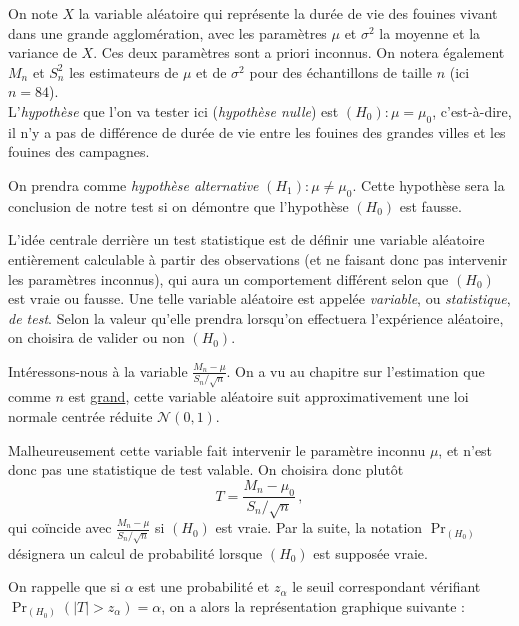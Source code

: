 \documentclass[12pt, a4paper]{book}
\numberwithin{equation}{section}
\begin{document}
 
On note $X$ la variable aléatoire qui représente la durée de vie des fouines vivant dans une grande 
agglomération, avec les paramètres $\mu$ et $\sigma^2$ la moyenne et la variance de $X$. 
Ces deux paramètres sont a priori inconnus. 
On notera également $M_n$ et $S^2_n$ les estimateurs de $\mu$ et de $\sigma^2$ pour des
échantillons de taille $n$ (ici $n=84$).\\

L'{\it hypothèse} que l'on va tester ici ({\it hypothèse nulle}) est $(H_0) : \mu=\mu_0$, c'est-à-dire, il n'y
a pas de différence de durée de vie entre les fouines des grandes villes et les fouines des campagnes.

On prendra comme {\it hypothèse alternative} $(H_1) : \mu \neq \mu_0$. Cette hypothèse sera la conclusion
de notre test si on démontre que l'hypothèse $(H_0)$ est fausse. 

L'idée centrale derrière un test statistique est de définir une variable aléatoire entièrement calculable à partir des observations (et ne faisant donc pas intervenir les paramètres inconnus), qui aura un comportement différent selon que $(H_0)$ est vraie ou fausse. Une telle variable aléatoire est appelée \emph{variable}, ou \emph{statistique}, \emph{de test}. Selon la valeur qu'elle prendra lorsqu'on effectuera l'expérience aléatoire, on choisira de valider ou non $(H_0)$.

Intéressons-nous à la variable $\displaystyle \frac{M_n-\mu}{S_n/\sqrt{n}}$. On a vu au chapitre sur l'estimation que comme $n$ est \underline{grand}, cette variable aléatoire suit 
approximativement une loi normale centrée réduite $\mathcal{N}(0,1)$. 

Malheureusement cette variable fait intervenir le paramètre inconnu $\mu$, et n'est donc pas une statistique de test valable. On choisira donc plutôt
$$
T=\frac{M_n-\mu_0}{S_n/\sqrt{n}}\,,
$$
qui coïncide avec $\displaystyle \frac{M_n-\mu}{S_n/\sqrt{n}}$ si $(H_0)$ est vraie. Par la suite, la notation $\Pr_{(H_0)}$ désignera un calcul de probabilité lorsque $(H_0)$ est supposée vraie.

On rappelle que si $\alpha$ est une probabilité et $z_{\alpha}$ le seuil correspondant
vérifiant $\Pr_{(H_0)}(|T|>z_{\alpha}) = \alpha$, on a alors la représentation graphique suivante :
\end{document}
